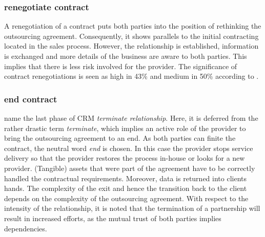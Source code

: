 	\subsubsection{renegotiate contract}
	A renegotiation of a contract puts both parties into the position of rethinking the outsourcing agreement. Consequently, it shows parallels to the initial contracting located in the sales process. However, the relationship is established, information is exchanged and more details of the business are aware to both parties. This implies that there is less risk involved for the provider. The significance of contract renegotiations is seen as high in 43\% and medium in 50\% according to \cite{itgov2005}.
	
	
	\subsubsection{end contract}
	\cite{reinartz2004customer} name the last phase of \acrshort{CRM} \textit{terminate relationship}. Here, it is deferred from the rather drastic term \textit{terminate}, which implies an active role of the provider to bring the outsourcing agreement to an end. As both parties can finite the contract, the neutral word \textit{end} is chosen. In this case the provider stops service delivery so that the provider restores the process in-house or looks for a new provider. (Tangible) assets that were part of the agreement have to be correctly handled \wrt the contractual requirements. Moreover, data is returned into clients hands. The complexity of the exit and hence the transition back to the client depends on the complexity of the outsourcing agreement. With respect to the intensity of the relationship, it is noted that the termination of a partnership will result in increased efforts, as the mutual trust of both parties implies dependencies. 
	 
